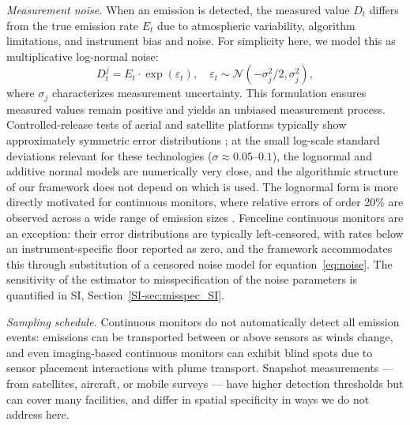 \documentclass[numsec,webpdf,modern,mediumone]{oup-authoring-template}
\newcommand{\new}[1]{#1}
\begin{document}
\textit{Measurement noise.} When an emission is detected, the measured value $D_t$ differs from the true emission rate $E_t$ due to atmospheric variability, algorithm limitations, and instrument bias and noise. For simplicity here, we model this as multiplicative log-normal noise:
\begin{equation}
    D^j_t = E_t \cdot \exp(\varepsilon_t), \quad \varepsilon_t \sim \mathcal{N}(-\sigma_j^2/2, \sigma_j^2),
    \label{eq:noise}
\end{equation}
where $\sigma_j$ characterizes measurement uncertainty. This formulation ensures measured values remain positive and yields an unbiased measurement process. \new{Controlled-release tests of aerial and satellite platforms typically show approximately symmetric error distributions \citep{Sherwin2023, ElAbbadi2024}; at the small log-scale standard deviations relevant for these technologies ($\sigma \approx 0.05$--$0.1$), the lognormal and additive normal models are numerically very close, and the algorithmic structure of our framework does not depend on which is used. The lognormal form is more directly motivated for continuous monitors, where relative errors of order 20\% are observed across a wide range of emission sizes \citep{Daniels2024}. Fenceline continuous monitors are an exception: their error distributions are typically left-censored, with rates below an instrument-specific floor reported as zero, and the framework accommodates this through substitution of a censored noise model for equation~\eqref{eq:noise}. The sensitivity of the estimator to misspecification of the noise parameters is quantified in SI, Section~\ref{SI-sec:misspec_SI}.}

\textit{Sampling schedule.} Continuous monitors do not automatically detect all emission events: emissions can be transported between or above sensors as winds change, and even imaging-based continuous monitors can exhibit blind spots due to sensor placement interactions with plume transport. Snapshot measurements — from satellites, aircraft, or mobile surveys — have higher detection thresholds but can cover many facilities, and differ in spatial specificity in ways we do not address here.
\end{document}
